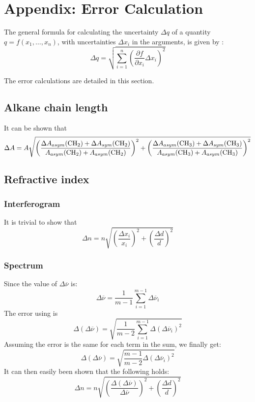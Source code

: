 \documentclass[12pt]{article}
\begin{document}
\newpage

\section{Appendix: Error Calculation}

The general formula for calculating the uncertainty $\Delta q$ of a quantity $q = f(x_1, \dots, x_n)$, with uncertainties $\Delta x_i$ in the arguments, is given by \cite{ErrorPropagation}:
\begin{equation}
    \Delta q = \sqrt{ \sum_{i=1}^n \left( \frac{\partial f}{\partial x_i} \Delta x_i \right)^2}
\end{equation}

The error calculations are detailed in this section.

\subsection{Alkane chain length}
It can be shown that
\begin{equation}
    \Delta A = A\sqrt{ \left( \frac{\Delta A_{asym} (\ce{CH2}) + \Delta A_{sym} (\ce{CH2})}{ A_{asym} (\ce{CH2}) + A_{asym} (\ce{CH2})} \right)^2 + \left( \frac{\Delta A_{asym} (\ce{CH3}) + \Delta A_{sym} (\ce{CH3})}{ A_{asym} (\ce{CH3}) + A_{asym} (\ce{CH3})} \right)^2}
\end{equation}

\subsection{Refractive index}
\subsubsection{Interferogram}
It is trivial to show that
\begin{equation}
    \Delta n = n \sqrt{ \left( \frac{\Delta x_i}{x_i} \right)^2 + \left( \frac{\Delta d}{d} \right)^2}
\end{equation}
\subsubsection{Spectrum}
Since the value of $\Delta \overline{\nu}$ is: 
\begin{equation}
    \Delta \overline{\nu} = \frac{1}{m-1}\sum_{i=1}^{m-1} \Delta \overline{\nu}_i
\end{equation}
The error using is
\begin{equation}
    \Delta(\Delta \overline{\nu}) = \sqrt{\frac{1}{m-2} \sum_{i=1}^{m-1} \Delta(\Delta \overline{\nu}_i)^2}
\end{equation}
Assuming the error is the same for each term in the sum, we finally get:
\begin{equation}
    \Delta(\Delta \overline{\nu}) = \sqrt{\frac{m-1}{m-2}\Delta(\Delta \overline{\nu}_i)^2}
\end{equation}
It can then easily been shown that the following holds:
\begin{equation}
    \Delta n = n \sqrt{ \left( \frac{\Delta (\Delta \overline{\nu})}{\Delta\overline{\nu}} \right)^2 + \left( \frac{\Delta d}{d} \right)^2}
\end{equation}
\end{document}
